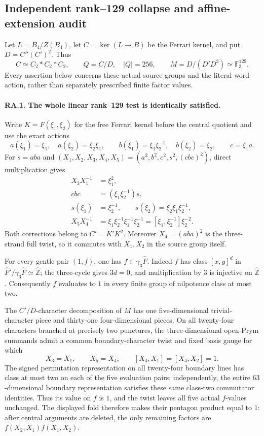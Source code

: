 \subsection*{Independent rank--129 collapse and affine-extension audit}

Let $L=B_4/Z(B_4)$, let $C=\ker(L\to B)$ be the Ferrari
kernel, and put $D=C''(C')^2$.  Thus
\[
 C\simeq C_2*C_2*C_2,\qquad Q=C/D,\quad |Q|=256,
 \qquad M=D/(D'D^3)\simeq\mathbb F_3^{129}.
\]
Every assertion below concerns these actual source groups and the literal
word action, rather than separately prescribed finite factor values.

\paragraph{RA.1. The whole linear rank--129 test is identically satisfied.}
Write $K=F(\xi_1,\xi_2)$ for the free Ferrari kernel before the
central quotient and use the exact actions
\[
 a(\xi_1)=\xi_1,\quad a(\xi_2)=\xi_2\xi_1,
 \qquad b(\xi_1)=\xi_1\xi_2^{-1},\quad b(\xi_2)=\xi_2,
 \qquad c=\xi_1a.
\]
For $s=aba$ and
$(X_1,X_2,X_3,X_4,X_5)=(a^2,b^2,c^2,s^2,(cbc)^2)$,
direct multiplication gives
\begin{align*}
 X_3X_1^{-1}&=\xi_1^2,\\
 cbc&=(\xi_1\xi_2^{-1})s,\\
 s(\xi_1)&=\xi_2^{-1},\qquad
 s(\xi_2)=\xi_2\xi_1\xi_2^{-1},\\
 X_5X_4^{-1}
 &=\xi_1\xi_2^{-1}\xi_1^{-1}\xi_2^{-1}
 =[\xi_1,\xi_2^{-1}]\xi_2^{-2}.
\end{align*}
Both corrections belong to $C'=K'K^2$.  Moreover $X_4=(aba)^2$
is the three-strand full twist, so it commutes with $X_1,X_2$ in
the source group itself.

For every gentle pair $(1,f)$, one has $f\in\gamma_3\widehat F$.
Indeed $f$ has class $[x,y]^d$ in
$\widehat F'/\gamma_3\widehat F\simeq\widehat{\mathbb Z}$;
the three-cycle gives $3d=0$, and multiplication by $3$ is injective
on $\widehat{\mathbb Z}$.  Consequently $f$ evaluates to $1$ in
every finite group of nilpotence class at most two.

The $C'/D$-character decomposition of $M$ has one five-dimensional
trivial-character piece and thirty-one four-dimensional pieces.
On all twenty-four characters branched at precisely two punctures,
the three-dimensional open-Prym summands admit a common
boundary-character twist and fixed basis gauge for which
\[
 X_3=X_1,\qquad X_5=X_4,\qquad
 [X_4,X_1]=[X_4,X_2]=1.
\]
The signed permutation representation on all twenty-four boundary
lines has class at most two on each of the five evaluation pairs;
independently, the entire $63$-dimensional boundary representation
satisfies these same class-two commutator identities.
Thus its value on $f$ is $1$, and the twist leaves all five actual
$f$-values unchanged.  The displayed fold therefore makes their
pentagon product equal to $1$: after central arguments are deleted,
the only remaining factors are $f(X_2,X_1)f(X_1,X_2)$.

